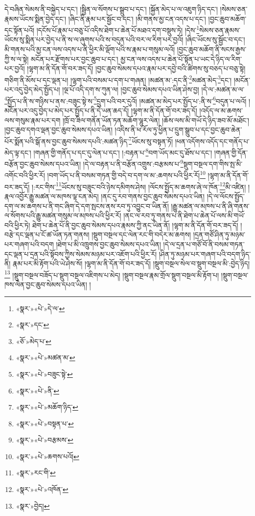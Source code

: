 དེ་བཞིན་སེམས་ནི་བསྐྱེད་པ་དང་། །སྦྱིན་ལ་སོགས་པ་སྒྲུབ་པ་དང་། །སྐྱོན་མེད་པ་ལ་འཇུག་ཉིད་དང་། །སེམས་ཅན་རྣམས་ཡོངས་སྨིན་བྱེད་དང་། །ཞིང་ནི་རྣམ་པར་སྦྱོང་བ་དང་། །མི་གནས་མྱ་ངན་འདས་པ་དང་། །བྱང་ཆུབ་མཆོག་དང་སྟོན་པའོ། །དངོས་པོ་རྣམ་པ་བཅུ་པོ་འདིས་ཐེག་པ་ཆེན་པོ་མཐའ་དག་བསྡུས་ཏེ། །དེས་\footnote{«སྣར་»«པེ་»དེ་ལ་}སེམས་ཅན་རྣམས་ཡོངས་སུ་སྨིན་པར་བྱེད་པ་ནི་ས་ལ་ཞུགས་པའི་ས་བདུན་པའི་བར་ལ་རིག་པར་བྱའོ། །ཞིང་ཡོངས་སུ་སྦྱོང་བ་དང་། མི་གནས་པའི་མྱ་ངན་ལས་འདས་པ་ནི་ཕྱིར་མི་ལྡོག་པའི་ས་རྣམ་པ་གསུམ་ལའོ། །བྱང་ཆུབ་མཆོག་ནི་སངས་རྒྱས་ཀྱི་ས་ལ་སྟེ། མངོན་པར་རྫོགས་པར་བྱང་ཆུབ་པ་དང་། མྱ་ངན་ལས་འདས་པ་ཆེན་པོ་སྟོན་པ་ཡང་དེ་ཉིད་ལ་རིག་པར་བྱའོ། །ལྷག་མ་ནི་དོན་གོ་བར་ཟད་དོ། །བྱང་ཆུབ་སེམས་དཔའ་རྣམ་པར་དབྱེ་བའི་ཚིགས་སུ་བཅད་པ་བཅུ་སྟེ། གཅིག་ནི་མོས་པ་དང་ལྡན་པ། །ལྷག་པའི་བསམ་པ་དག་པ་གཞན། །མཚན་མ་:དང་ནི་\footnote{«སྣར་»དང་}མཚན་མེད་\footnote{«ཅོ་»མེད་པ་}དང་། །མངོན་པར་འདུ་བྱེད་མེད་སྤྱོད་པ། །ལྔ་པོ་འདི་དག་ས་ཀུན་ལ། །བྱང་ཆུབ་སེམས་དཔའ་ཡིན་ཤེས་བྱ། །དེ་ལ་:མཚན་མ་ལ་\footnote{«སྣར་»«པེ་»མཚན་མ་}སྤྱོད་པ་ནི་ས་གཉིས་པ་ནས་:བཟུང་སྟེ་ས་\footnote{«སྣར་»«པེ་»བཟུང་སྟེ་}དྲུག་པའི་བར་དུའོ། །མཚན་མ་མེད་པར་སྤྱོད་པ་:ནི་ས་\footnote{«སྣར་»«པེ་»ནི་}བདུན་པ་ལའོ། །མངོན་པར་འདུ་བྱེད་པ་མེད་པར་སྤྱོད་པ་ནི་དེ་ཡན་ཆད་དོ། །ལྷག་མ་ནི་དོན་གོ་བར་ཟད་དོ། །འདོད་ལ་མ་ཆགས་ལས་གསུམ་རྣམ་པར་དག །ཁྲོ་བ་ཟིལ་གནོན་ཡོན་ཏན་མཆོག་ལྷུར་ལེན། །ཆོས་ལས་མི་གཡོ་དེ་ཉིད་ཟབ་མོ་མཐོང་། །བྱང་ཆུབ་དགའ་ལྡན་བྱང་ཆུབ་སེམས་དཔའ་ཡིན། །འདིས་ནི་ཕ་རོལ་ཏུ་ཕྱིན་པ་དྲུག་སྒྲུབ་པ་དང་བྱང་ཆུབ་ཆེན་པོར་སྨོན་པའི་སྒོ་ནས་བྱང་ཆུབ་སེམས་དཔའི་:མཚན་ཉིད་\footnote{«སྣར་»«པེ་»མཆོག་ཉིད་}ཡོངས་སུ་བསྟན་ཏོ། །ཕན་འདོགས་འདོད་དང་གནོད་པ་མེད་ལྟ་དང་། །གཞན་གྱི་གནོད་པ་དང་དུ་ལེན་པ་དང་། །:བརྟན་པ་\footnote{«སྣར་»«པེ་»བསྟན་པ་}བག་ཡོད་མང་དུ་ཐོས་པ་དང་། །གཞན་གྱི་དོན་བརྩོན་བྱང་ཆུབ་སེམས་དཔའ་ཡིན། །དེ་ལ་བརྟན་པ་ནི་བརྩོན་འགྲུས་:བརྩམས་པ་\footnote{«སྣར་»«པེ་»བརྩམས་}སྡུག་བསྔལ་དག་གིས་སྤ་མི་འགོང་བའི་ཕྱིར་རོ། །བག་ཡོད་པ་ནི་བསམ་གཏན་གྱི་བདེ་བ་དག་ལ་མ་:ཆགས་པའི་ཕྱིར་རོ།\footnote{«སྣར་»«པེ་»ཆགས་པའོ།} །ལྷག་མ་ནི་དོན་གོ་བར་ཟད་དོ། །:རང་གིས་\footnote{«སྣར་»རང་གི་}ཡོངས་སུ་བཟུང་བའི་ཉེས་དམིགས་ཤེས། །ལོངས་སྤྱོད་མ་ཆགས་ཞེ་ལ་ཁོན་\footnote{«སྣར་»«པེ་»འཁོན་}མི་འཛིན། །རྣལ་འབྱོར་རྒྱུ་མཚན་ལ་མཁས་ལྟ་ངན་མེད། །ནང་དུ་རབ་གནས་བྱང་ཆུབ་སེམས་དཔའ་ཡིན། །དེ་ལ་ལོངས་སྤྱོད་དག་ལ་མ་ཆགས་པ་ནི་གང་ཞིག་དེ་དག་སྤངས་ནས་རབ་ཏུ་འབྱུང་བ་ཡིན་ནོ། །རྒྱུ་མཚན་ལ་མཁས་པ་ནི་ཞི་གནས་ལ་སོགས་པའི་རྒྱུ་མཚན་གསུམ་ལ་མཁས་པའི་ཕྱིར་རོ། །ནང་ལ་རབ་ཏུ་གནས་པ་ནི་ཐེག་པ་ཆེན་པོ་ལས་མི་གཡོ་བའི་ཕྱིར་ཏེ། ཐེག་པ་ཆེན་པོ་ནི་བྱང་ཆུབ་སེམས་དཔའ་རྣམས་ཀྱི་ནང་ཡིན་ནོ། །ལྷག་མ་ནི་དོན་གོ་བར་ཟད་དོ། །བརྩེ་དང་ལྡན་པ་ངོ་ཚ་ཡོན་ཏན་གནས། །སྡུག་བསྔལ་དང་ལེན་རང་གི་བདེར་མ་ཆགས། །དྲན་གཙོ་ཤིན་ཏུ་མཉམ་པར་གཞག་པའི་བདག །ཐེག་པ་མི་འཁྲུགས་བྱང་ཆུབ་སེམས་དཔའ་ཡིན། །དེ་ལ་དྲན་པ་གཙོ་བོ་ནི་བསམ་གཏན་དང་ལྡན་པ་དྲན་པའི་སྟོབས་ཀྱིས་སེམས་མཉམ་པར་འཇོག་པའི་ཕྱིར་རོ། །ཤིན་ཏུ་མཉམ་པར་གཞག་པའི་བདག་ཉིད་ནི། རྣམ་པར་མི་རྟོག་པའི་ཡེ་ཤེས་སོ། །ལྷག་མ་ནི་དོན་གོ་བར་ཟད་དོ། །སྡུག་བསྔལ་སེལ་བ་སྡུག་བསྔལ་མི་:བྱེད་ཉིད།\footnote{«སྣར་»བྱེད།} །སྡུག་བསྔལ་བཟོད་པ་སྡུག་བསྔལ་འཇིགས་པ་མེད། །སྡུག་བསྔལ་རྣམ་གྲོལ་སྡུག་བསྔལ་མི་རྟོག་པ། །སྡུག་བསྔལ་ཁས་ལེན་བྱང་ཆུབ་སེམས་དཔའ་ཡིན། །
